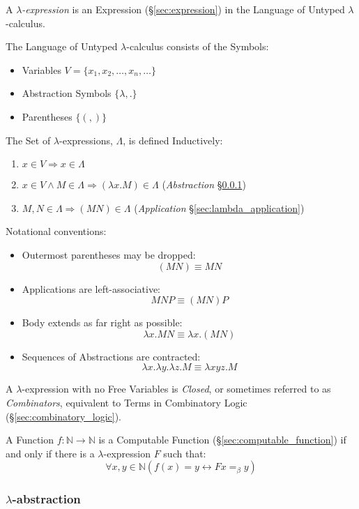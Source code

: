 A \emph{$\lambda$-expression} is an Expression
(\S\ref{sec:expression}) in the Language of Untyped
$\lambda$-calculus.

The Language of Untyped $\lambda$-calculus consists of the Symbols:
\begin{itemize}
  \item Variables $V = \{ x_1, x_2, \ldots, x_n, \ldots \}$
  \item Abstraction Symbols $\{ \lambda, . \}$
  \item Parentheses $\{ (, ) \}$
\end{itemize}

The Set of $\lambda$-expressions, $\Lambda$, is defined Inductively:
\begin{enumerate}
  \item $x \in V \Rightarrow x \in \Lambda$
  \item $x \in V \wedge M \in \Lambda \Rightarrow (\lambda x.M) \in
    \Lambda$ (\emph{Abstraction} \S\ref{sec:lambda_abstraction})
  \item $M,N \in \Lambda \Rightarrow (M N) \in \Lambda$
    (\emph{Application} \S\ref{sec:lambda_application})
\end{enumerate}
Notational conventions:
\begin{itemize}
  \item Outermost parentheses may be dropped:
    \[
      (M N) \equiv M N
    \]
  \item Applications are left-associative:
    \[
      M N P \equiv (M N) P
    \]
  \item Body extends as far right as possible:
    \[
      \lambda x.M N \equiv \lambda x.(M N)
    \]
  \item Sequences of Abstractions are contracted:
    \[
      \lambda x.\lambda y.\lambda z.M \equiv
      \lambda xyz.M
    \]
\end{itemize}

A $\lambda$-expression with no Free Variables is \emph{Closed}, or
sometimes referred to as \emph{Combinators}, equivalent to Terms in
Combinatory Logic (\S\ref{sec:combinatory_logic}).

A Function $f : \mathbb{N} \rightarrow \mathbb{N}$ is a Computable
Function (\S\ref{sec:computable_function}) if and only if there is a
$\lambda$-expression $F$ such that:
\[
  \forall x,y \in \mathbb{N} (f(x)=y \leftrightarrow F x =_\beta y)
\]



\subsubsection{$\lambda$-abstraction}\label{sec:lambda_abstraction}


